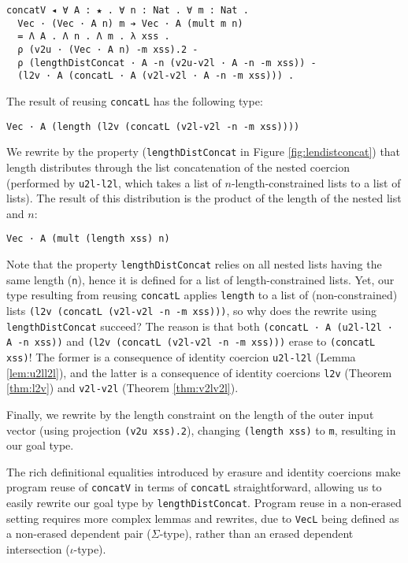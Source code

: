 \documentclass[a4paper,envcountsame,envcountsect]{llncs}
\newcommand{\reffig}[1]{Figure \ref{fig:#1}}
\newcommand{\refthm}[1]{Theorem \ref{thm:#1}}
\newcommand{\reflem}[1]{Lemma \ref{lem:#1}}
\begin{document}
\begin{verbatim}
concatV ◂ ∀ A : ★ . ∀ n : Nat . ∀ m : Nat .
  Vec · (Vec · A n) m ➔ Vec · A (mult m n)
  = Λ A . Λ n . Λ m . λ xss .
  ρ (v2u · (Vec · A n) -m xss).2 -
  ρ (lengthDistConcat · A -n (v2u-v2l · A -n -m xss)) -
  (l2v · A (concatL · A (v2l-v2l · A -n -m xss))) .
\end{verbatim}

The result of reusing \texttt{concatL} has the following type:

\begin{verbatim}
Vec · A (length (l2v (concatL (v2l-v2l -n -m xss))))
\end{verbatim}

We rewrite by the property
(\texttt{lengthDistConcat} in \reffig{lendistconcat})
that length distributes through the list concatenation of
the nested coercion (performed by \texttt{u2l-l2l},
which takes a list of $n$-length-constrained lists to a
list of lists). The result of this distribution is the product of the
length of the nested list and $n$:

\begin{verbatim}
Vec · A (mult (length xss) n)
\end{verbatim}

Note that the property \texttt{lengthDistConcat} relies on all nested
lists having the same length (\texttt{n}), hence it is defined for a
list of length-constrained lists. Yet, our type resulting from reusing
\texttt{concatL} applies \texttt{length} to a list of
(non-constrained) lists \texttt{(l2v (concatL (v2l-v2l -n -m xss)))},
so why does the rewrite using \texttt{lengthDistConcat} succeed?
The reason is that both \texttt{(concatL · A (u2l-l2l · A -n xss))}
and \texttt{(l2v (concatL (v2l-v2l -n -m xss)))} erase to
\texttt{(concatL xss)}! The former is a consequence of
identity coercion \texttt{u2l-l2l} (\reflem{u2ll2l}),
and the latter is a consequence of identity coercions
\texttt{l2v} (\refthm{l2v}) and \texttt{v2l-v2l} (\refthm{v2lv2l}).

Finally, we rewrite by the length constraint on the length of the
outer input vector (using projection \texttt{(v2u xss).2}),
changing \texttt{(length xss)} to \texttt{m}, resulting
in our goal type.

\begin{remark}
The rich definitional equalities introduced by erasure and identity
coercions make program reuse of \texttt{concatV} in terms of
\texttt{concatL} straightforward, allowing us to easily rewrite
our goal type by \texttt{lengthDistConcat}. Program reuse in a
non-erased setting requires more complex lemmas and rewrites, due to
\texttt{VecL} being defined as a non-erased dependent pair
($\Sigma$-type), rather than an erased dependent intersection
($\iota$-type).
\end{remark}
\end{document}
